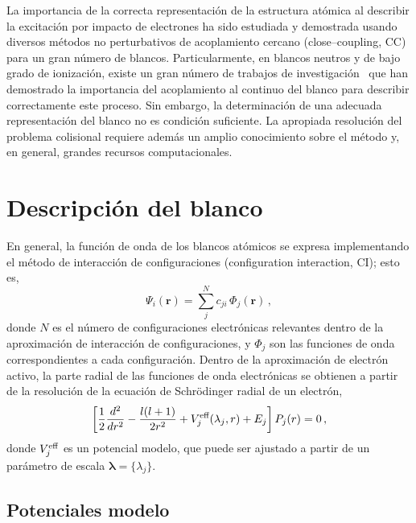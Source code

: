La importancia de la correcta representación de la estructura atómica al 
describir la excitación por impacto de electrones ha sido estudiada y 
demostrada usando diversos métodos no perturbativos de acoplamiento 
cercano (close--coupling, CC) \cite{Bartschat:04,Zatsarinny:16,
Be_Ballance:03} para un gran número de blancos. Particularmente, en 
blancos neutros y de bajo grado de ionización, existe un gran número de 
trabajos de investigación~\cite{Ballance:03,Badnell:03,Mitnik:03} que han 
demostrado la importancia del acoplamiento al continuo del blanco para 
describir correctamente este proceso. Sin embargo, la determinación de 
una adecuada representación del blanco no es condición suficiente. La 
apropiada resolución del problema colisional requiere además un amplio 
conocimiento sobre el método y, en general, grandes recursos 
computacionales.


\newpage
\section{Descripción del blanco}

En general, la función de onda de los blancos atómicos se expresa 
implementando el método de interacción de configuraciones (configuration
interaction, CI); esto es,
\begin{equation*}
\Psi_i(\mathbf{r}) =
\sum_j^{N} c_{ji} \, \Phi_j(\mathbf{r})\,,
\end{equation*}
donde $N$ es el número de configuraciones electrónicas relevantes dentro
de la aproximación de interacción de configuraciones, y $\Phi_j$ son las
funciones de onda correspondientes a cada configuración. Dentro de la 
aproximación de electrón activo, la parte radial de las funciones de 
onda electrónicas se obtienen a partir de la resolución de la ecuación 
de Schr\"odinger radial de un electrón,
\begin{equation*}
\left[ \frac{1}{2} \frac{d^2}{dr^2} - \frac{l(l+1)}{2r^2} 
 + V_j^{\mbox{\scriptsize eff}}(\lambda_j,r)
 + E_j \right] P_j(r)=0\,,
\end{equation*}
donde $V_j^{\mbox{\scriptsize eff}}$ es un potencial modelo, que puede 
ser ajustado a partir de un parámetro de escala 
$\boldsymbol\lambda=\{\lambda_j\}$. 


\subsection{Potenciales modelo}

